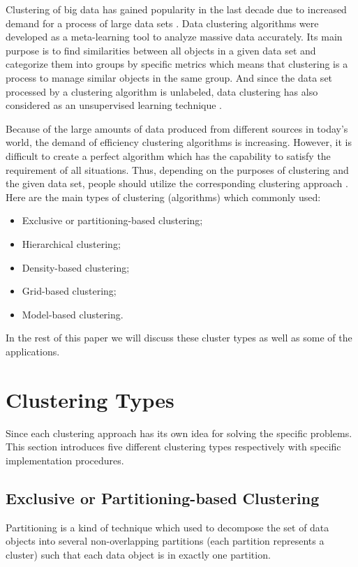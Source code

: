 \documentclass[sigconf]{acmart}
\begin{document}
Clustering of big data has gained popularity in the last decade due to increased demand for a process of large data sets \cite{bcab}. Data clustering algorithms were developed as a meta-learning tool to analyze massive data accurately. Its main purpose is to find similarities between all objects in a given data set and categorize them into groups by specific metrics which means that clustering is a process to manage similar objects in the same group. And since the data set processed by a clustering algorithm is unlabeled, data clustering has also considered as an unsupervised learning technique \cite{dcaa}.

Because of the large amounts of data produced from different sources in today's world, the demand of efficiency clustering algorithms is increasing. However, it is difficult to create a perfect algorithm which has the capability to satisfy the requirement of all situations. Thus, depending on the purposes of clustering and the given data set, people should utilize the corresponding clustering approach \cite{bcab}. Here are the main types of clustering (algorithms) which commonly used:
\begin{itemize}
\item Exclusive or partitioning-based clustering;
\item Hierarchical clustering;
\item Density-based clustering;
\item Grid-based clustering;
\item Model-based clustering.
\end{itemize}
In the rest of this paper we will discuss these cluster types as well as some of the applications.

\section{Clustering Types}
Since each clustering approach has its own idea for solving the specific problems. This section introduces five different clustering types respectively with specific implementation procedures.
\subsection{Exclusive or Partitioning-based Clustering}

Partitioning is a kind of technique which used to decompose the set of data objects into several non-overlapping partitions (each partition represents a cluster) such that each data object is in exactly one partition.
\end{document}
